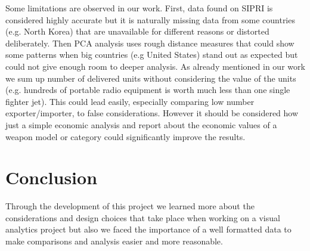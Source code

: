 \documentclass{article}
\begin{document}
\begin{multicols}{2}
Some limitations are observed in our work. First, data found on SIPRI is considered highly accurate but it is naturally missing data from some countries (e.g. North Korea) that are unavailable for different reasons or distorted deliberately. Then PCA analysis uses rough distance measures that could show some patterns when big countries (e.g United States) stand out as expected but could not give enough room to deeper analysis.
As already mentioned in our work we sum up number of delivered units without considering the value of the units (e.g. hundreds of portable radio equipment is worth much less than one single fighter jet). This could lead easily, especially comparing low number exporter/importer, to false considerations. However it should be considered how just a simple economic analysis and report about the economic values of a weapon model or category could significantly improve the results.




\section{Conclusion}
Through the development of this project we learned more about the considerations and design choices that take place when working on a visual analytics project but also we faced the importance of a well formatted data to make comparisons and analysis easier and more reasonable.

\end{multicols}

\end{document}
